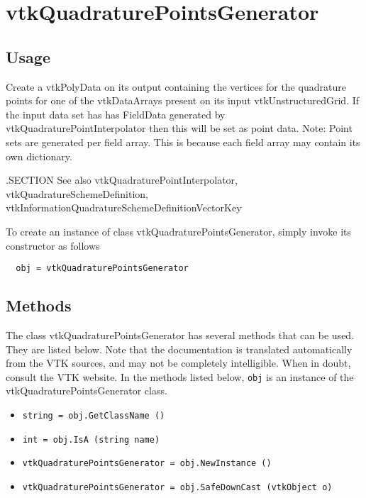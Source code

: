 \section{vtkQuadraturePointsGenerator}

\subsection{Usage}


 Create a vtkPolyData on its output containing the vertices
 for the quadrature points for one of the vtkDataArrays present
 on its input vtkUnstructuredGrid. If the input data set has
 has FieldData generated by vtkQuadraturePointInterpolator then
 this will be set as point data. Note: Point sets are generated
 per field array. This is because each field array may contain
 its own dictionary.

 .SECTION See also
 vtkQuadraturePointInterpolator, vtkQuadratureSchemeDefinition, vtkInformationQuadratureSchemeDefinitionVectorKey

To create an instance of class vtkQuadraturePointsGenerator, simply
invoke its constructor as follows
\begin{verbatim}
  obj = vtkQuadraturePointsGenerator
\end{verbatim}
\subsection{Methods}

The class vtkQuadraturePointsGenerator has several methods that can be used.
  They are listed below.
Note that the documentation is translated automatically from the VTK sources,
and may not be completely intelligible.  When in doubt, consult the VTK website.
In the methods listed below, \verb|obj| is an instance of the vtkQuadraturePointsGenerator class.
\begin{itemize}
\item  \verb|string = obj.GetClassName ()|

\item  \verb|int = obj.IsA (string name)|

\item  \verb|vtkQuadraturePointsGenerator = obj.NewInstance ()|

\item  \verb|vtkQuadraturePointsGenerator = obj.SafeDownCast (vtkObject o)|

\end{itemize}
